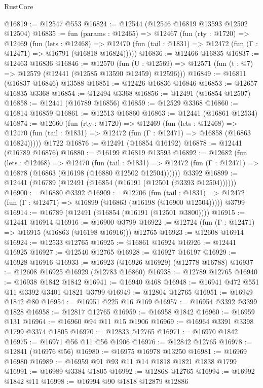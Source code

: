\begin{lexlean}{RustCore}
\begin{coremodule}
@16819 := @12547 @553
@16824 := @12544 (@12546 @16819 @13593 @12502 @12504)
@16835 := fun (params : @12465) =>
  @12467
    (fun (rty : @1720) =>
    @12469
      (fun (lets : @12468) =>
      @12470 (fun (tail : @1831) => @12472 (fun (Γ : @12471) => @16791 (@16818 @16824)))))
@16836 := @12466 @16835
@16837 := @12463 @16836
@16846 := @12570
    (fun (U : @12569) => @12571 (fun (t : @7) => @12579 (@12441 (@12585 @13590 @12459) @12596)))
@16849 := @16811 (@16837 @16846) @13588
@16851 := @12426 @16836 @16846
@16853 := @12657 @16835 @3368
@16854 := @12494 @3368
@16856 := @12491 (@16854 @12507)
@16858 := @12441 (@16789 @16856)
@16859 := @12529 @3368
@16860 := @16814 @16859
@16861 := @12513 @16860
@16863 := @12441 (@16861 @12534)
@16874 := @12660
    (fun (rty : @1720) =>
    @12469
      (fun (lets : @12468) =>
      @12470 (fun (tail : @1831) => @12472 (fun (Γ : @12471) => @16858 (@16863 @16824)))))
    @1722
@16876 := @12491 (@16854 @16192)
@16878 := @12441 (@16789 @16876)
@16880 := @16199 @16819 @13593
@16892 := @12682
    (fun (lets : @12468) =>
    @12470
      (fun (tail : @1831) =>
      @12472 (fun (Γ : @12471) => @16878 (@16863 (@16198 (@16880 @12502 @12504))))))
    @3392
@16899 := @12441 (@16789 (@12491 (@16854 (@16191 (@12501 (@3393 @12504))))))
@16900 := @16880 @3392
@16909 := @12706
    (fun (tail : @1831) => @12472 (fun (Γ : @12471) => @16899 (@16863 (@16198 (@16900 @12504)))))
    @3799
@16914 := @16789 (@12491 (@16854 (@16191 (@12501 @3800))))
@16915 := @12441 @16914
@16916 := @16900 @3799
@16922 := @12724 (fun (Γ : @12471) => @16915 (@16863 (@16198 @16916))) @12765
@16923 := @12608 @16914
@16924 := @12533 @12765
@16925 := @16861 @16924
@16926 := @12441 @16925
@16927 := @12540 @12765
@16928 := @16927 @16197
@16929 := @16928 @16916
@16933 := @16923 (@16926 @16929) (@12778 @16788)
@16937 := @12608 @16925 @16929 (@12783 @16860)
@16938 := @12789 @12765
@16940 := @16938 @1842 @1842
@16941 := @16940 @468
@16948 := @16941 @472 @551 @11 @3392 @3401 @1821 @3799
@16949 := @12804 @12765
@16951 := @16949 @1842 @80
@16954 := @16951 @225 @16 @169
@16957 := @16954 @3392 @3399 @1828
@16958 := @12817 @12765
@16959 := @16958 @1842
@16960 := @16959 @131
@16964 := @16960 @94 @11 @15 @1906
@16969 := @16964 @3391 @3398 @1799 @3374 @1805
@16970 := @12833 @12765
@16971 := @16970 @1842
@16975 := @16971 @56 @11 @56 @1906
@16976 := @12842 @12765
@16978 := @12841 (@16976 @56)
@16980 := @16975 @16978 @13250
@16981 := @16969 @16980
@16989 := @16959 @91 @93 @11 @14 @1818 @1821 @1838 @1799
@16991 := @16989 @3384 @1805
@16992 := @12868 @12765
@16994 := @16992 @1842 @11
@16998 := @16994 @90 @1818 @12879 @12886

\end{coremodule}
\end{lexlean}

